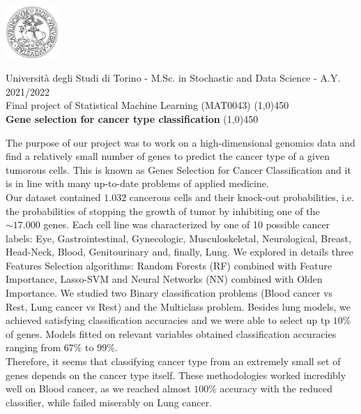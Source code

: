 \documentclass[a4paper,11pt, oneside]{article}  %
\begin{document}
\setcounter{secnumdepth}{2}
\pagestyle{plain} %

\centerline {\includegraphics[width=2cm]{logo.jpg}}
\begin{center}
	Università degli Studi di Torino - M.Sc.  in Stochastic and Data Science - A.Y.  2021/2022 \\
	\Large { Final project of Statistical Machine Learning (MAT0043)}
	\line(1,0){450}\\ 
	\vspace{0.4cm} 
	{ \huge \textbf{Gene selection for cancer type classification} }
	\vspace{0.1cm}
	\line(1,0){450} \\
\end{center}


The purpose of our project was to work on a high-dimensional genomics data and find a relatively small number of genes to predict the cancer type of a given tumorous cells. This is known as Genes Selection for Cancer Classification and it is in line with many up-to-date problems of applied medicine. \\
Our dataset contained $1.032$ cancerous cells and their knock-out probabilities, i.e. the probabilities of stopping the growth of tumor by inhibiting one of the $\sim 17.000$ genes. Each cell line was characterized by one of 10 possible cancer labels: Eye, Gastrointestinal, Gynecologic, Musculoskeletal, Neurological, Breast, Head-Neck, Blood, Genitourinary and, finally, Lung. We explored in details three Features Selection algorithms: Random Forests (RF) combined with Feature Importance, Lasso-SVM and Neural Networks (NN) combined with Olden Importance.  We studied two Binary classification problems (Blood cancer vs Rest, Lung cancer vs Rest) and the Multiclass problem. Besides lung models, we achieved satisfying classification accuracies and we were able to select up tp $10\%$ of genes. Models fitted on relevant variables obtained classification accuracies ranging from $67\%$ to $99\%$. \\
Therefore, it seems that classifying cancer type from an extremely small set of genes depends on the cancer type itself. These methodologies worked incredibly well on Blood cancer, as  we reached almost $100\%$ accuracy with the reduced classifier,  while failed miserably on Lung cancer.  
\end{document}
